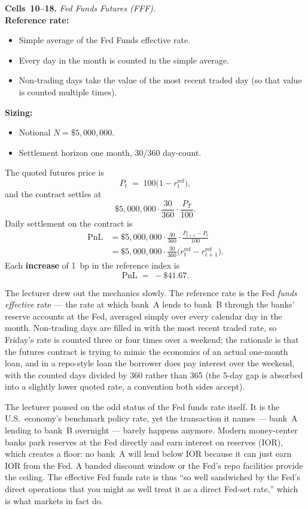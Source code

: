 \begin{keyblock}
\textbf{Cells~10--18.} \emph{Fed Funds Futures (FFF).}\\
\textbf{Reference rate:}
\begin{itemize}
  \item Simple average of the Fed Funds effective rate.
  \item Every day in the month is counted in the simple average.
  \item Non-trading days take the value of the most recent traded day (so
        that value is counted multiple times).
\end{itemize}
\textbf{Sizing:}
\begin{itemize}
  \item Notional $N = \$5{,}000{,}000$.
  \item Settlement horizon one month, 30/360 day-count.
\end{itemize}
The quoted futures price is
\[
  P_t \;=\; 100\bigl(1 - r^{\text{ref}}_t\bigr),
\]
and the contract settles at
\[
  \$5{,}000{,}000 \cdot \frac{30}{360} \cdot \frac{P_T}{100}.
\]
Daily settlement on the contract is
\begin{align*}
  \mathrm{PnL} &= \$5{,}000{,}000 \cdot \frac{30}{360} \cdot \frac{P_{t+1}-P_t}{100} \\
  &= \$5{,}000{,}000 \cdot \frac{30}{360}\bigl(r^{\text{ref}}_t - r^{\text{ref}}_{t+1}\bigr).
\end{align*}
Each \textbf{increase} of 1~bp in the reference index is
\[
  \mathrm{PnL} \;=\; -\$41.67.
\]
\end{keyblock}

The lecturer drew out the mechanics slowly. The reference rate is the Fed
\emph{funds effective} rate --- the rate at which bank~A lends to bank~B
through the banks' reserve accounts at the Fed, averaged simply over every
calendar day in the month. Non-trading days are filled in with the most
recent traded rate, so Friday's rate is counted three or four times over a
weekend; the rationale is that the futures contract is trying to mimic the
economics of an actual one-month loan, and in a repo-style loan the
borrower does pay interest over the weekend, with the counted days divided
by 360 rather than 365 (the 5-day gap is absorbed into a slightly lower
quoted rate, a convention both sides accept).

The lecturer paused on the odd status of the Fed funds rate itself. It is
the U.S.~economy's benchmark policy rate, yet the transaction it names ---
bank~A lending to bank~B overnight --- barely happens anymore. Modern
money-center banks park reserves at the Fed directly and earn interest on
reserves (IOR), which creates a floor: no bank~A will lend below IOR because
it can just earn IOR from the Fed. A banded discount window or the Fed's
repo facilities provide the ceiling. The effective Fed funds rate is thus
``so well sandwiched by the Fed's direct operations that you might as well
treat it as a direct Fed-set rate,'' which is what markets in fact do.

